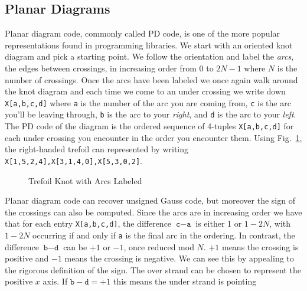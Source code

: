     \subsection{Planar Diagrams}
        Planar diagram code, commonly called PD code, is one of the more popular
        representations found in programming libraries. We start with an
        oriented knot diagram and pick a starting point. We follow the
        orientation and label the \textit{arcs}, the edges between crossings,
        in increasing order from $0$ to $2N-1$ where $N$ is the number of
        crossings. Once the arcs have been labeled we once again walk around
        the knot diagram and each time we come to an under crossing we write
        down \texttt{X[a,b,c,d]} where \texttt{a} is the number of the arc you
        are coming from, \texttt{c} is the arc you'll be leaving through,
        \texttt{b} is the arc to your \textit{right}, and \texttt{d} is the
        arc to your \textit{left}. The PD code of the diagram is the ordered
        sequence of 4-tuples \texttt{X[a,b,c,d]} for each under crossing you
        encounter in the order you encounter them. Using
        Fig.~\ref{fig:trefoil_knot_arcs_labeled}, the right-handed trefoil can
        represented by writing \texttt{X[1,5,2,4],X[3,1,4,0],X[5,3,0,2]}.
        \begin{figure}
            \centering
            \caption{Trefoil Knot with Arcs Labeled}
            \label{fig:trefoil_knot_arcs_labeled}
        \end{figure}
        \par\hfill\par
        Planar diagram code can recover unsigned Gauss code, but moreover
        the sign of the crossings can also be computed. Since the arcs are in
        increasing order we have that for each entry \texttt{X[a,b,c,d]},
        the difference $\texttt{c}-\texttt{a}$ is either 1 or $1-2N$,
        with $1-2N$ occurring if and only if \texttt{a} is the final
        arc in the ordering. In contrast, the difference $\texttt{b}-\texttt{d}$
        can be $+1$ or $-1$, once reduced mod $N$. $+1$ means the crossing is
        positive and $-1$ means the crossing is negative. We can see this by
        appealing to the rigorous definition of the sign. The over strand can
        be chosen to represent the positive $x$ axis. If
        $\texttt{b}-\texttt{d}=+1$ this means the under strand is pointing
